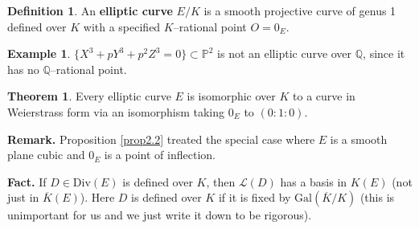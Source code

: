 \documentclass{article}
\theoremstyle{definition}
\newtheorem{theorem}{Theorem}[section]
\newtheorem{example}{Example}[section]
\newtheorem{defn}{Definition}[section]
\begin{document}
\begin{defn}
    An \textbf{elliptic curve} $E/K$ is a smooth projective curve of genus 1 defined over $K$ with a specified $K$--rational point $O = 0_E$.
\end{defn}
\begin{example}
    $\{X^3 + pY^3 + p^2Z^3 = 0\} \subset \mathbb{P}^2$ is not an elliptic curve over $\mathbb{Q}$, since it has no $\mathbb{Q}$--rational point.
\end{example}
\begin{theorem}
    Every elliptic curve $E$ is isomorphic over $K$ to a curve in Weierstrass form via an isomorphism taking $0_E$ to $(0:1:0)$.
\end{theorem}
\textbf{Remark.} Proposition \ref{prop2.2} treated the special case where $E$ is a smooth plane cubic and $0_E$ is a point of inflection.
\vspace{1mm}
 
\textbf{Fact.} If $D \in \text{Div}(E)$ is defined over $K$, then $\mathcal{L}(D)$ has a basis in $K(E)$ (not just in $\overline{K}(E)$). Here $D$ is defined over $K$ if it is fixed by $\text{Gal}(\overline{K}/K)$ (this is unimportant for us and we just write it down to be rigorous).
\end{document}
